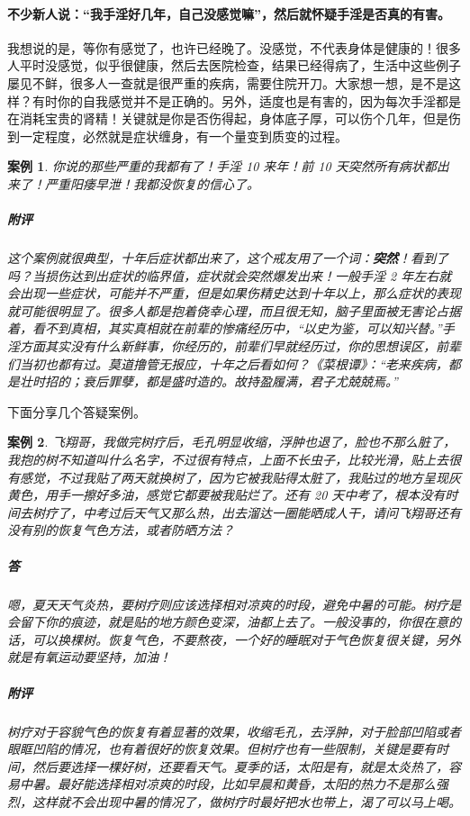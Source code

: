 \documentclass{ctexart}
\newtheorem{case}{案例}
\begin{document}
\paragraph{不少新人说：“我手淫好几年，自己没感觉嘛”，然后就怀疑手淫是否真的有害。}

我想说的是，等你有感觉了，也许已经晚了。没感觉，不代表身体是健康的！很多人平时没感觉，似乎很健康，然后去医院检查，结果已经得病了，生活中这些例子屡见不鲜，很多人一查就是很严重的疾病，需要住院开刀。大家想一想，是不是这样？有时你的自我感觉并不是正确的。另外，适度也是有害的，因为每次手淫都是在消耗宝贵的肾精！关键就是你是否伤得起，身体底子厚，可以伤个几年，但是伤到一定程度，必然就是症状缠身，有一个量变到质变的过程。

\begin{case}
    你说的那些严重的我都有了！手淫 10 来年！前 10 天突然所有病状都出来了！严重阳痿早泄！我都没恢复的信心了。
    \subparagraph{附评} 这个案例就很典型，十年后症状都出来了，这个戒友用了一个词：\textbf{突然}！看到了吗？当损伤达到出症状的临界值，症状就会突然爆发出来！一般手淫 2 年左右就会出现一些症状，可能并不严重，但是如果伤精史达到十年以上，那么症状的表现就可能很明显了。很多人都是抱着侥幸心理，而且很无知，脑子里面被无害论占据着，看不到真相，其实真相就在前辈的惨痛经历中，“以史为鉴，可以知兴替。”手淫方面其实没有什么新鲜事，你经历的，前辈们早就经历过，你的思想误区，前辈们当初也都有过。莫道撸管无报应，十年之后看如何？《菜根谭》：“老来疾病，都是壮时招的；衰后罪孽，都是盛时造的。故持盈履满，君子尤兢兢焉。”
\end{case}

下面分享几个答疑案例。

\begin{case}
    飞翔哥，我做完树疗后，毛孔明显收缩，浮肿也退了，脸也不那么脏了，我抱的树不知道叫什么名字，不过很有特点，上面不长虫子，比较光滑，贴上去很有感觉，不过我贴了两天就换树了，因为它被我贴得太脏了，我贴过的地方呈现灰黄色，用手一擦好多油，感觉它都要被我贴烂了。还有 20 天中考了，根本没有时间去树疗了，中考过后天气又那么热，出去溜达一圈能晒成人干，请问飞翔哥还有没有别的恢复气色方法，或者防晒方法？
    \subparagraph{答} 嗯，夏天天气炎热，要树疗则应该选择相对凉爽的时段，避免中暑的可能。树疗是会留下你的痕迹，就是贴的地方颜色变深，油都上去了。一般没事的，你很在意的话，可以换棵树。恢复气色，不要熬夜，一个好的睡眠对于气色恢复很关键，另外就是有氧运动要坚持，加油！
    \subparagraph{附评} 树疗对于容貌气色的恢复有着显著的效果，收缩毛孔，去浮肿，对于脸部凹陷或者眼眶凹陷的情况，也有着很好的恢复效果。但树疗也有一些限制，关键是要有时间，然后要选择一棵好树，还要看天气。夏季的话，太阳是有，就是太炎热了，容易中暑。最好能选择相对凉爽的时段，比如早晨和黄昏，太阳的热力不是那么强烈，这样就不会出现中暑的情况了，做树疗时最好把水也带上，渴了可以马上喝。
\end{case}
\end{document}
